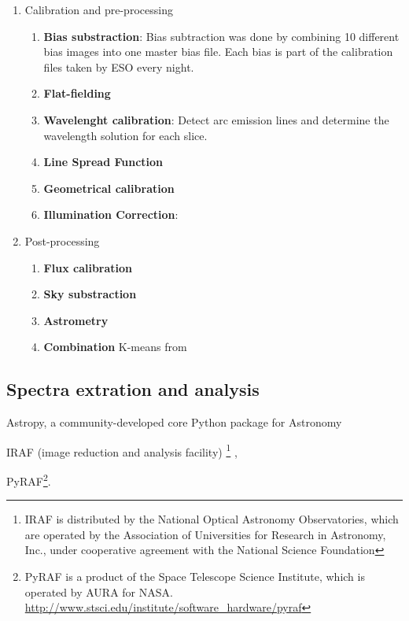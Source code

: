 \begin{enumerate}
        \item Calibration and pre-processing
                \begin{enumerate}[I]
        \item \textbf{Bias substraction}: Bias subtraction was done by combining 10 different bias images into one master bias file. Each bias is part of the calibration files taken by ESO every night.   
        \item \textbf{Flat-fielding}
        \item \textbf{Wavelenght calibration}: Detect arc emission lines and determine the wavelength solution for each slice.
        \item \textbf{Line Spread Function}
        \item \textbf{Geometrical calibration}
        \item \textbf{Illumination Correction}:
    \end{enumerate}
\item Post-processing
                \begin{enumerate}[I]
                        \item \textbf{Flux calibration}
                        \item \textbf{Sky substraction}
                        \item \textbf{Astrometry}
                        \item \textbf{Combination} K-means from 
                \end{enumerate}
\end{enumerate}


\subsection{Spectra extration and analysis}

Astropy, a community-developed core Python package for Astronomy \citep{astropy_collaboration_astropy:_2013}

IRAF (image reduction and analysis facility) \footnote{IRAF is distributed by the National Optical Astronomy Observatories, which are operated by the Association of Universities for Research in Astronomy, Inc., under cooperative agreement with the National Science Foundation} \citep{1986SPIE..627..733T},   


PyRAF\footnote{PyRAF is a product of the Space Telescope Science Institute, which is operated by AURA for NASA. \url{http://www.stsci.edu/institute/software_hardware/pyraf}}.



